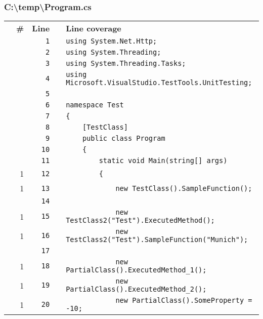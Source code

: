 \documentclass[a4paper,landscape,10pt]{article}
\begin{document}
\subsubsection{C:\textbackslash temp\textbackslash Program.cs}
\begin{longtable}[l]{lrrll}
\textbf{} & \textbf{\#} & \textbf{Line} & \textbf{} & \textbf{Line coverage}\\
\cellcolor{gray} &  & \verb~1~ & & \verb~using System.Net.Http;~\\
\cellcolor{gray} &  & \verb~2~ & & \verb~using System.Threading;~\\
\cellcolor{gray} &  & \verb~3~ & & \verb~using System.Threading.Tasks;~\\
\cellcolor{gray} &  & \verb~4~ & & \verb~using Microsoft.VisualStudio.TestTools.UnitTesting;~\\
\cellcolor{gray} &  & \verb~5~ & & \verb~~\\
\cellcolor{gray} &  & \verb~6~ & & \verb~namespace Test~\\
\cellcolor{gray} &  & \verb~7~ & & \verb~{~\\
\cellcolor{gray} &  & \verb~8~ & & \verb~    [TestClass]~\\
\cellcolor{gray} &  & \verb~9~ & & \verb~    public class Program~\\
\cellcolor{gray} &  & \verb~10~ & & \verb~    {~\\
\cellcolor{gray} &  & \verb~11~ & & \verb~        static void Main(string[] args)~\\
\cellcolor{green} & 1 & \verb~12~ & & \verb~        {~\\
\cellcolor{green} & 1 & \verb~13~ & & \verb~            new TestClass().SampleFunction();~\\
\cellcolor{gray} &  & \verb~14~ & & \verb~~\\
\cellcolor{green} & 1 & \verb~15~ & & \verb~            new TestClass2("Test").ExecutedMethod();~\\
\cellcolor{green} & 1 & \verb~16~ & & \verb~            new TestClass2("Test").SampleFunction("Munich");~\\
\cellcolor{gray} &  & \verb~17~ & & \verb~~\\
\cellcolor{green} & 1 & \verb~18~ & & \verb~            new PartialClass().ExecutedMethod_1();~\\
\cellcolor{green} & 1 & \verb~19~ & & \verb~            new PartialClass().ExecutedMethod_2();~\\
\cellcolor{green} & 1 & \verb~20~ & & \verb~            new PartialClass().SomeProperty = -10;~\\

\end{longtable}
\end{document}
